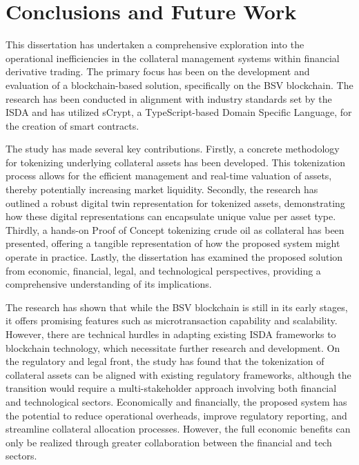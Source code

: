 \chapter{Conclusions and Future Work}
\label{ch:conclusions}

This dissertation has undertaken a comprehensive exploration into the operational inefficiencies in the collateral management systems within financial derivative trading. The primary focus has been on the development and evaluation of a blockchain-based solution, specifically on the BSV blockchain. The research has been conducted in alignment with industry standards set by the ISDA and has utilized sCrypt, a TypeScript-based Domain Specific Language, for the creation of smart contracts.

The study has made several key contributions. Firstly, a concrete methodology for tokenizing underlying collateral assets has been developed. This tokenization process allows for the efficient management and real-time valuation of assets, thereby potentially increasing market liquidity. Secondly, the research has outlined a robust digital twin representation for tokenized assets, demonstrating how these digital representations can encapsulate unique value per asset type. Thirdly, a hands-on Proof of Concept tokenizing crude oil as collateral has been presented, offering a tangible representation of how the proposed system might operate in practice. Lastly, the dissertation has examined the proposed solution from economic, financial, legal, and technological perspectives, providing a comprehensive understanding of its implications.

The research has shown that while the BSV blockchain is still in its early stages, it offers promising features such as microtransaction capability and scalability. However, there are technical hurdles in adapting existing ISDA frameworks to blockchain technology, which necessitate further research and development. On the regulatory and legal front, the study has found that the tokenization of collateral assets can be aligned with existing regulatory frameworks, although the transition would require a multi-stakeholder approach involving both financial and technological sectors. Economically and financially, the proposed system has the potential to reduce operational overheads, improve regulatory reporting, and streamline collateral allocation processes. However, the full economic benefits can only be realized through greater collaboration between the financial and tech sectors.

